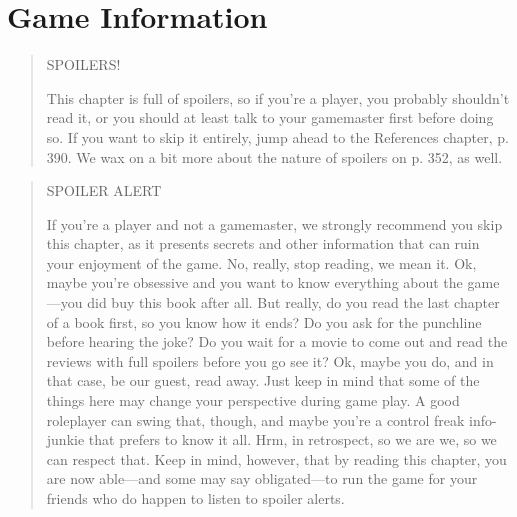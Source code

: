 
\chapter{Game Information}
\label{cha:game-information}




\begin{quotation}
\begin{LARGE}
\begin{center}
SPOILERS!
\end{center}
\end{LARGE}
This chapter is full of spoilers, so if you’re a player, you probably shouldn’t read it,
or you should at least talk to your gamemaster first before doing so. If you want
to skip it entirely, jump ahead to the References chapter, p. 390. We wax on a bit
more about the nature of spoilers on p. 352, as well.
\end{quotation}

\pagebreak



\begin{quotation}
\begin{LARGE}
SPOILER ALERT
\end{LARGE}

If you’re a player and not a gamemaster, we strongly recommend you skip this chapter, as it presents
secrets and other information that can ruin your enjoyment of the game. No, really, stop reading, we mean
it. Ok, maybe you’re obsessive and you want to know everything about the game—you did buy this book
after all. But really, do you read the last chapter of a book first, so you know how it ends? Do you ask for
the punchline before hearing the joke? Do you wait for a movie to come out and read the reviews with
full spoilers before you go see it? Ok, maybe you do, and in that case, be our guest, read away. Just keep
in mind that some of the things here may change your perspective during game play. A good roleplayer
can swing that, though, and maybe you’re a control freak info-junkie that prefers to know it all. Hrm, in
retrospect, so we are we, so we can respect that. Keep in mind, however, that by reading this chapter, you
are now able—and some may say obligated—to run the game for your friends who do happen to listen to
spoiler alerts.
\end{quotation}


